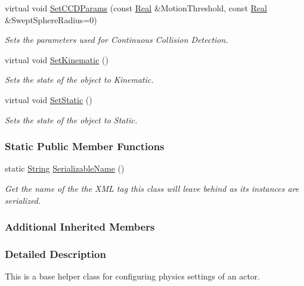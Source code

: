 \begin{DoxyCompactItemize}
virtual void \hyperlink{classMezzanine_1_1ActorBasePhysicsSettings_a702a20cfb7d87dbc2a7d44ba9260ead2}{Set\-C\-C\-D\-Params} (const \hyperlink{namespaceMezzanine_a726731b1a7df72bf3583e4a97282c6f6}{Real} \&Motion\-Threshold, const \hyperlink{namespaceMezzanine_a726731b1a7df72bf3583e4a97282c6f6}{Real} \&Swept\-Sphere\-Radius=0)
\begin{DoxyCompactList}\small\item\em Sets the parameters used for Continuous Collision Detection. \end{DoxyCompactList}\item 
virtual void \hyperlink{classMezzanine_1_1ActorBasePhysicsSettings_a3b01243f038e30eb39b04f8e38fb8a14}{Set\-Kinematic} ()
\begin{DoxyCompactList}\small\item\em Sets the state of the object to Kinematic. \end{DoxyCompactList}\item 
virtual void \hyperlink{classMezzanine_1_1ActorBasePhysicsSettings_ac72f39fa6bc9e2f050fdf90e42dd0deb}{Set\-Static} ()
\begin{DoxyCompactList}\small\item\em Sets the state of the object to Static. \end{DoxyCompactList}\end{DoxyCompactItemize}
\subsubsection*{Static Public Member Functions}
\begin{DoxyCompactItemize}
\item 
static \hyperlink{namespaceMezzanine_acf9fcc130e6ebf08e3d8491aebcf1c86}{String} \hyperlink{classMezzanine_1_1ActorBasePhysicsSettings_aa386f1bf24f1cc09fceba5d337c3ab29}{Serializable\-Name} ()
\begin{DoxyCompactList}\small\item\em Get the name of the the X\-M\-L tag this class will leave behind as its instances are serialized. \end{DoxyCompactList}\end{DoxyCompactItemize}
\subsubsection*{Additional Inherited Members}


\subsubsection{Detailed Description}
This is a base helper class for configuring physics settings of an actor. 

